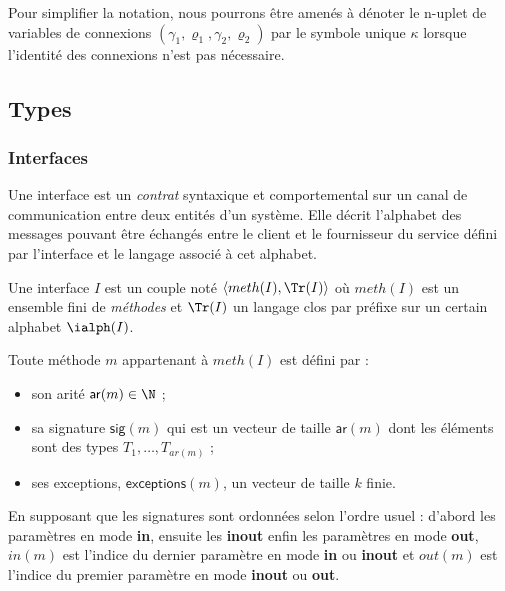 Pour simplifier la notation,  nous pourrons \^etre amen\'es \`a d\'enoter le
n-uplet de variables de connexions $(\gamma_1,\varrho_1,\gamma_2,\varrho_2)$ par le
symbole unique $\kappa$ lorsque l'identit\'e des connexions n'est pas n\'ecessaire.

\subsection{Types}
\label{sec:types}

\subsubsection{Interfaces}

Une interface est un \emph{contrat} syntaxique et comportemental sur
un canal de communication entre deux entit\'es d'un syst\`eme. Elle
d\'ecrit l'alphabet des messages  pouvant \^etre
\'echang\'es entre le client et le fournisseur du service
d\'efini par l'interface et le langage associ\'e \`a cet alphabet.

\begin{definition}[Interface]
\label{def:typeinterface}
Une interface $I$ est un couple not\'e $\langle meth(I),
\Tr(I)\rangle$ o\`u $meth(I)$ est un ensemble fini de \emph{m\'ethodes}
et $\Tr(I)$ un langage clos par pr\'efixe sur un certain alphabet
$\ialph(I)$.
\end{definition} 

Toute m\'ethode $m$ appartenant \`a $meth(I)$ est d\'efini par :
\begin{itemize}
  \item son arit\'e $\mathsf{ar}(m)\in \N$ ;
  \item sa signature $\mathsf{sig}(m)$ qui est un vecteur de taille
    $\mathsf{ar}(m)$ dont les \'el\'ements sont des types ${T_1}, \dots ,{T_{ar(m)}}$ ;
  \item ses exceptions, $\mathsf{exceptions}(m)$, un vecteur de
    taille $k$ finie.
\end{itemize}

En supposant que les signatures sont ordonn\'ees selon l'ordre usuel
: d'abord les param\`etres en mode \textbf{in}, ensuite les
\textbf{inout} enfin les param\`etres en mode \textbf{out}, $in(m)$
est l'indice du dernier param\`etre en mode \textbf{in} ou
\textbf{inout} et $out(m)$ est l'indice du premier param\`etre en
mode \textbf{inout} ou \textbf{out}. 


